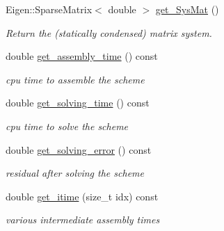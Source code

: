 \begin{DoxyCompactItemize}
Eigen\+::\+Sparse\+Matrix$<$ double $>$ \hyperlink{classHArDCore2D_1_1HHO__LocVarDiff_afef8cb4110ec3b95f3c83090fe26d598}{get\+\_\+\+Sys\+Mat} ()
\begin{DoxyCompactList}\small\item\em Return the (statically condensed) matrix system. \end{DoxyCompactList}\item 
\mbox{\label{classHArDCore2D_1_1HHO__LocVarDiff_a9c37d2cf2744465d0bf50ff02fe185f9}} 
double \hyperlink{classHArDCore2D_1_1HHO__LocVarDiff_a9c37d2cf2744465d0bf50ff02fe185f9}{get\+\_\+assembly\+\_\+time} () const
\begin{DoxyCompactList}\small\item\em cpu time to assemble the scheme \end{DoxyCompactList}\item 
\mbox{\label{classHArDCore2D_1_1HHO__LocVarDiff_ad184ecd99c5da4172395a210d0289c12}} 
double \hyperlink{classHArDCore2D_1_1HHO__LocVarDiff_ad184ecd99c5da4172395a210d0289c12}{get\+\_\+solving\+\_\+time} () const
\begin{DoxyCompactList}\small\item\em cpu time to solve the scheme \end{DoxyCompactList}\item 
\mbox{\label{classHArDCore2D_1_1HHO__LocVarDiff_a9648b003ca1d519794bcc5407c8ce606}} 
double \hyperlink{classHArDCore2D_1_1HHO__LocVarDiff_a9648b003ca1d519794bcc5407c8ce606}{get\+\_\+solving\+\_\+error} () const
\begin{DoxyCompactList}\small\item\em residual after solving the scheme \end{DoxyCompactList}\item 
\mbox{\label{classHArDCore2D_1_1HHO__LocVarDiff_a61e65ce589db4203515ae8e1f5c30d0f}} 
double \hyperlink{classHArDCore2D_1_1HHO__LocVarDiff_a61e65ce589db4203515ae8e1f5c30d0f}{get\+\_\+itime} (size\+\_\+t idx) const
\begin{DoxyCompactList}\small\item\em various intermediate assembly times \end{DoxyCompactList}\item 

\end{DoxyCompactItemize}
